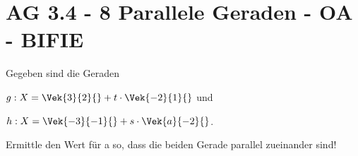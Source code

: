 \section{AG 3.4 - 8 Parallele Geraden - OA - BIFIE}

\begin{beispiel}[AG 3.4]{1} %
Gegeben sind die Geraden
 
$g:X=\Vek{3}{2}{}+t\cdot\Vek{-2}{1}{}$ und
 
$h:X=\Vek{-3}{-1}{}+s\cdot\Vek{a}{-2}{}$.

Ermittle den Wert für a so, dass die beiden Gerade parallel zueinander sind!

\end{beispiel}